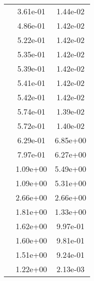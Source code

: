 \begin{table}
\begin{tabular}{c|cc|}
\multicolumn{1}{|c|}{} & \multicolumn{1}{|c|}{  3.61e-01} & \multicolumn{1}{|c|}{  1.44e-02} \\ 
\multicolumn{1}{|c|}{} & \multicolumn{1}{|c|}{  4.86e-01} & \multicolumn{1}{|c|}{  1.42e-02} \\ 
\multicolumn{1}{|c|}{} & \multicolumn{1}{|c|}{  5.22e-01} & \multicolumn{1}{|c|}{  1.42e-02} \\ 
\multicolumn{1}{|c|}{} & \multicolumn{1}{|c|}{  5.35e-01} & \multicolumn{1}{|c|}{  1.42e-02} \\ 
\multicolumn{1}{|c|}{} & \multicolumn{1}{|c|}{  5.39e-01} & \multicolumn{1}{|c|}{  1.42e-02} \\ 
\multicolumn{1}{|c|}{} & \multicolumn{1}{|c|}{  5.41e-01} & \multicolumn{1}{|c|}{  1.42e-02} \\ 
\multicolumn{1}{|c|}{} & \multicolumn{1}{|c|}{  5.42e-01} & \multicolumn{1}{|c|}{  1.42e-02} \\ 
\multicolumn{1}{|c|}{} & \multicolumn{1}{|c|}{  5.74e-01} & \multicolumn{1}{|c|}{  1.39e-02} \\ 
\multicolumn{1}{|c|}{} & \multicolumn{1}{|c|}{  5.72e-01} & \multicolumn{1}{|c|}{  1.40e-02} \\ 
\multicolumn{1}{|c|}{} & \multicolumn{1}{|c|}{  6.29e-01} & \multicolumn{1}{|c|}{  6.85e+00} \\ 
\multicolumn{1}{|c|}{} & \multicolumn{1}{|c|}{  7.97e-01} & \multicolumn{1}{|c|}{  6.27e+00} \\ 
\multicolumn{1}{|c|}{} & \multicolumn{1}{|c|}{  1.09e+00} & \multicolumn{1}{|c|}{  5.49e+00} \\ 
\multicolumn{1}{|c|}{} & \multicolumn{1}{|c|}{  1.09e+00} & \multicolumn{1}{|c|}{  5.31e+00} \\ 
\multicolumn{1}{|c|}{} & \multicolumn{1}{|c|}{  2.66e+00} & \multicolumn{1}{|c|}{  2.66e+00} \\ 
\multicolumn{1}{|c|}{} & \multicolumn{1}{|c|}{  1.81e+00} & \multicolumn{1}{|c|}{  1.33e+00} \\ 
\multicolumn{1}{|c|}{} & \multicolumn{1}{|c|}{  1.62e+00} & \multicolumn{1}{|c|}{  9.97e-01} \\ 
\multicolumn{1}{|c|}{} & \multicolumn{1}{|c|}{  1.60e+00} & \multicolumn{1}{|c|}{  9.81e-01} \\ 
\multicolumn{1}{|c|}{} & \multicolumn{1}{|c|}{  1.51e+00} & \multicolumn{1}{|c|}{  9.24e-01} \\ 
\multicolumn{1}{|c|}{} & \multicolumn{1}{|c|}{  1.22e+00} & \multicolumn{1}{|c|}{  2.13e-03} \\ 

\end{tabular}
\end{table}
